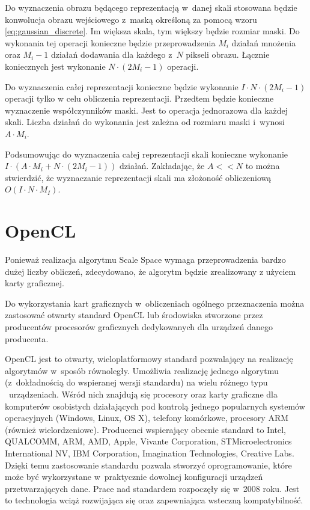 Do wyznaczenia obrazu będącego reprezentacją w~danej skali stosowana będzie konwolucja obrazu wejściowego z~maską określoną za pomocą wzoru \ref{eq:gaussian_discrete}. Im większa skala, tym większy będzie rozmiar maski. Do wykonania tej operacji konieczne będzie przeprowadzenia $ M_i $ działań mnożenia oraz $ M_i - 1 $ działań dodawania dla każdego z~$N$ pikseli obrazu. Łącznie koniecznych jest wykonanie $ N \cdot (2M_i - 1) $ operacji.

Do wyznaczenia całej reprezentacji konieczne będzie wykonanie $ I \cdot N \cdot (2M_i - 1) $ operacji tylko w celu obliczenia reprezentacji. Przedtem będzie konieczne wyznaczenie współczynników maski. Jest to operacja jednorazowa dla każdej skali. Liczba działań do wykonania jest zależna od rozmiaru maski i~wynosi $ A \cdot M_i $.

Podsumowując do wyznaczenia całej reprezentacji skali konieczne wykonanie $ I \cdot (A \cdot M_i + N \cdot (2M_i - 1)) $ działań. Zakładając, że $ A << N $ to można stwierdzić, że wyznaczanie reprezentacji skali ma złożoność obliczeniową $ O(I \cdot N \cdot M_I) $.

\section{OpenCL}
\label{sec:OpenCL}

Ponieważ realizacja algorytmu Scale Space wymaga przeprowadzenia bardzo dużej liczby obliczeń, zdecydowano, że algorytm będzie zrealizowany z użyciem karty graficznej.

Do wykorzystania kart graficznych w~obliczeniach ogólnego przeznaczenia można zastosować otwarty standard OpenCL lub środowiska stworzone przez producentów procesorów graficznych dedykowanych dla urządzeń danego producenta.

OpenCL jest to otwarty, wieloplatformowy standard pozwalający na realizację algorytmów w~sposób równoległy. Umożliwia realizację jednego algorytmu (z~dokładnością do wspieranej wersji standardu) na wielu różnego typu ~urządzeniach. Wśród nich znajdują się procesory oraz karty graficzne dla komputerów osobistych działających pod kontrolą jednego popularnych systemów operacyjnych (Windows, Linux, OS X), telefony komórkowe, procesory ARM (również wielordzeniowe). Producenci wspierający obecnie standard to Intel,
QUALCOMM,
ARM,
AMD,
Apple,
Vivante Corporation,
STMicroelectronics International NV,
IBM Corporation,
Imagination Technologies,
Creative Labs.
Dzięki temu zastosowanie standardu pozwala stworzyć oprogramowanie, które może być wykorzystane w~praktycznie dowolnej konfiguracji urządzeń przetwarzających dane. Prace nad standardem rozpoczęły się w~2008 roku. Jest to technologia wciąż rozwijająca się oraz zapewniająca wsteczną kompatybilność. 


